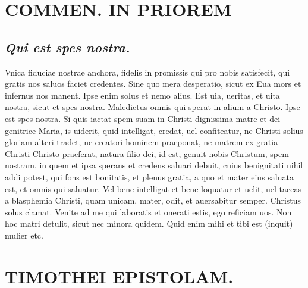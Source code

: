 \documentclass{article}
\begin{document}
\begin{pages}
\section*{COMMEN. IN PRIOREM }
\marginpar{[ p.6 ]}
{}
\subsection*{\textit{Qui est spes nostra. }}\pstart Vnica fiduciae nostrae anchora, fidelis in promissis qui pro nobis satisfecit, qui gratis nos saluos faciet credentes. Sine quo mera desperatio, sicut ex Eua mors et infernus nos manent. Ipse enim solus et nemo alius. Est uia, ueritas, et uita nostra, sicut et spes nostra. Maledictus omnis qui sperat in alium a Christo. Ipse est spes nostra. Si quis iactat spem suam in Christi dignissima matre et dei genitrice Maria, is uiderit, quid intelligat, credat, uel confiteatur, ne Christi solius gloriam alteri tradet, ne creatori hominem praeponat, ne matrem ex gratia Christi Christo praeferat, natura filio dei, id est, genuit nobis Christum, spem nostram, in quem et ipsa sperans et credens saluari debuit, cuius benignitati nihil addi potest, qui fons est bonitatis, et plenus gratia, a quo et mater eius saluata est, et omnis qui saluatur. Vel bene intelligat et bene loquatur et uelit, uel taceas a blasphemia Christi, quam unicam, mater, odit, et auersabitur semper. Christus solus clamat. Venite ad me qui laboratis et onerati estis, ego reficiam uos. Non hoc matri detulit, sicut nec minora quidem. Quid enim mihi et tibi est (inquit) mulier etc.  \pend
\section*{TIMOTHEI EPISTOLAM. }
\marginpar{[ p.7 ]}
{}

\end{pages}
\end{document}
